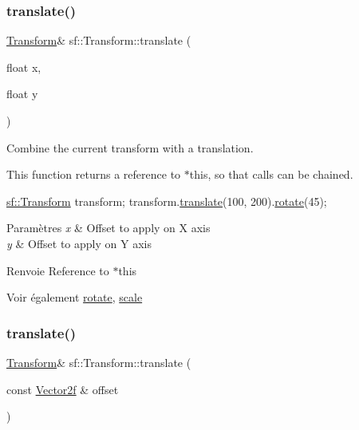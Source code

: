 \subsubsection{\texorpdfstring{translate()}{translate()}\hspace{0.1cm}{\footnotesize\ttfamily [1/2]}}
{\footnotesize\ttfamily \hyperlink{classsf_1_1Transform}{Transform}\& sf\+::\+Transform\+::translate (\begin{DoxyParamCaption}\item[{float}]{x,  }\item[{float}]{y }\end{DoxyParamCaption})}



Combine the current transform with a translation. 

This function returns a reference to $\ast$this, so that calls can be chained. 
\begin{DoxyCode}
\hyperlink{classsf_1_1Transform}{sf::Transform} transform;
transform.\hyperlink{classsf_1_1Transform_ab54f6c8070cc05e2afcb3145fbf4395a}{translate}(100, 200).\hyperlink{classsf_1_1Transform_a3e548c3c9e3fb9d4bd43cf852669e555}{rotate}(45);
\end{DoxyCode}



\begin{DoxyParams}{Paramètres}
{\em x} & Offset to apply on X axis \\
\hline
{\em y} & Offset to apply on Y axis\\
\hline
\end{DoxyParams}
\begin{DoxyReturn}{Renvoie}
Reference to $\ast$this
\end{DoxyReturn}
\begin{DoxySeeAlso}{Voir également}
\hyperlink{classsf_1_1Transform_a3e548c3c9e3fb9d4bd43cf852669e555}{rotate}, \hyperlink{classsf_1_1Transform_a3f46af807f69d74120fb836334268671}{scale} 
\end{DoxySeeAlso}
\mbox{\label{classsf_1_1Transform_a452ff6e32d5120fa8c132c1bf0ad83cd}} 
\subsubsection{\texorpdfstring{translate()}{translate()}\hspace{0.1cm}{\footnotesize\ttfamily [2/2]}}
{\footnotesize\ttfamily \hyperlink{classsf_1_1Transform}{Transform}\& sf\+::\+Transform\+::translate (\begin{DoxyParamCaption}\item[{const \hyperlink{classsf_1_1Vector2}{Vector2f} \&}]{offset }\end{DoxyParamCaption})}



